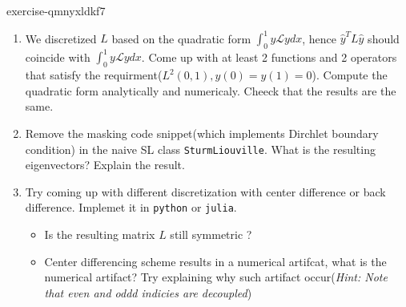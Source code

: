 \begin{mystexercise}{}{exercise-qmnyxldkf7}\label{exercise-qMNYxldkF7}\label{exercise-qmnyxldkf7}\begin{enumerate}
\item We discretized $L$ based on the quadratic form $\int_0^1 y\mathcal L y dx$, hence $\hat y^T L\hat y$ should coincide with $\int_0^1 y\mathcal L y dx$. Come up with at least 2 functions and 2 operators that satisfy the requirment($L^2(0,1),y(0)=y(1)=0$). Compute the quadratic form analytically and numericaly. Cheeck that the results are the same.
\item Remove the masking code snippet(which implements Dirchlet boundary condition) in the naive SL class \texttt{SturmLiouville}. What is the resulting eigenvectors? Explain the result.
\item Try coming up with different discretization with center difference or back difference. Implemet it in \texttt{python}
or \texttt{julia}.

\begin{itemize}
\item Is the resulting matrix $L$ still symmetric ?
\item Center differencing scheme results in a numerical artifcat, what is the numerical artifact? Try explaining why such artifact occur(\textit{Hint: Note that even and oddd indicies are decoupled})
\end{itemize}
\end{enumerate}

\end{mystexercise}
%  
% 
%